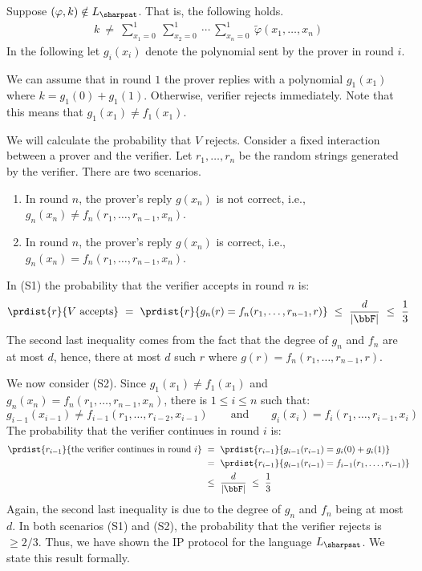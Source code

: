 \documentclass[11pt, a4paper]{article}
\begin{document}
Suppose $(\varphi,k)\notin L_{\sharpsat}$.
That is, the following holds.
\begin{align*}
k \ \neq \
\sum_{x_1=0}^1\ \sum_{x_2=0}^1\ \cdots\ \sum_{x_n=0}^1 \ \widetilde{\varphi}(x_1,\ldots,x_n)
\end{align*}
In the following let $g_i(x_i)$ denote the polynomial sent by the prover in round $i$.

We can assume that in round $1$ the prover replies with a polynomial $g_1(x_1)$ where $k=g_1(0)+g_1(1)$.
Otherwise, verifier rejects immediately.
Note that this means that $g_1(x_1)\neq f_1(x_1)$.

We will calculate the probability that $V$ rejects.
Consider a fixed interaction between a prover and the verifier.
Let $r_1,\ldots,r_n$ be the random strings generated by the verifier.
There are two scenarios.
\begin{enumerate}[(S1)]
\item
In round $n$, the prover's reply $g(x_n)$ is not correct, i.e., $g_n(x_n)\neq f_n(r_1,\ldots,r_{n-1},x_n)$.
\item 
In round $n$, the prover's reply $g(x_n)$ is correct, i.e., $g_n(x_n)= f_n(r_1,\ldots,r_{n-1},x_n)$.
\end{enumerate}

In (S1) the probability that the verifier accepts in round $n$ is:
$$
\prdist {r} {V \ \text{accepts}}\ =\ \prdist {r} {g_n(r)=f_n(r_1,\ldots,r_{n-1},r)}\ \leq\ \frac{d}{|\bbF|}\ \leq\ \frac{1}{3}
$$
The second last inequality comes from the fact that the degree of $g_n$ and $f_n$ are at most $d$,
hence, there at most $d$ such $r$ where $g(r)= f_n(r_1,\ldots,r_{n-1},r)$.

We now consider (S2).
Since $g_1(x_1)\neq f_1(x_1)$ and $g_n(x_n) = f_n(r_1,\ldots,r_{n-1},x_n)$,
there is $1\leq i \leq n$ such that:
$$
g_{i-1}(x_{i-1})\neq  f_{i-1}(r_1,\ldots,r_{i-2},x_{i-1})
\qquad\text{and}\qquad
g_i(x_i) = f_i(r_1,\ldots,r_{i-1},x_i)
$$
The probability that the verifier continues in round $i$ is:
\begin{align*}
\prdist {r_{i-1}} { \text{the verifier continues in round} \ i }
&\ = \
\prdist {r_{i-1}} { g_{i-1}(r_{i-1})= g_{i}(0)+g_{i}(1) }
\\
&\ = \  \prdist {r_{i-1}} { g_{i-1}(r_{i-1})= f_{i-1}(r_1,\ldots,r_{i-1}) }
\\
&\ \leq \ \frac{d}{|\bbF|}\ \leq\ \frac{1}{3} 
\end{align*}
Again, the second last inequality is due to the degree of $g_n$ and $f_n$ being at most $d$.
In both scenarios (S1) and (S2), the probability that the verifier rejects is $\geq 2/3$.
Thus, we have shown the IP protocol for the language $L_{\sharpsat}$.
We state this result formally.
\end{document}
